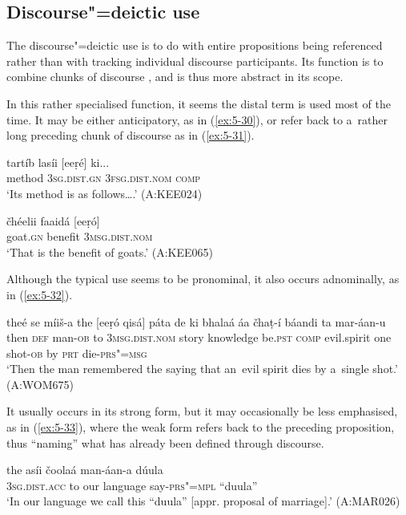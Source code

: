 \subsection{Discourse"=deictic use}
\label{subsec:5-2-5}

The discourse"=deictic use is to do with entire propositions being referenced rather than with tracking individual discourse participants. Its function is to combine chunks of discourse \citep[432]{diessel2006}, and is thus more abstract in its scope.



In this rather specialised function, it seems the distal term is used most of the time. It may be either anticipatory, as in (\ref{ex:5-30}), or refer back to a~rather long preceding chunk of discourse as in (\ref{ex:5-31}).

\begin{exe}
\ex
\label{ex:5-30}
\gll tartíb lasíi [eeṛé] ki...\\
method \textsc{3sg}.\textsc{dist.gn} \textsc{3fsg}.\textsc{dist.nom} \textsc{comp}\\
\glt `Its method is as follows{\ldots}.' (A:KEE024)

\ex
\label{ex:5-31}
\gll čhéelii faaidá [eeṛó]\\
goat.\textsc{gn} benefit \textsc{3msg}.\textsc{dist.nom}\\
\glt `That is the benefit of goats.' (A:KEE065)
\end{exe}
Although the typical use seems to be pronominal, it also occurs adnominally, as in (\ref{ex:5-32}).
\begin{exe}
\ex
\label{ex:5-32}
\gll theé se míiš-a the [eeṛó qisá] páta de ki bhalaá áa čhaṭ-í báandi ta mar-áan-u\\
then \textsc{def} man-\textsc{ob} to \textsc{3msg}.\textsc{dist.nom} story knowledge be.\textsc{pst} \textsc{comp} evil.spirit one shot-\textsc{ob} by \textsc{prt} die-\textsc{prs"=msg}\\
\glt `Then the man remembered the saying that an~evil spirit dies by a~single shot.' (A:WOM675)
\end{exe}
It usually occurs in its strong form, but it may occasionally be less emphasised, as in (\ref{ex:5-33}), where the weak form refers back to the preceding proposition, thus ``naming'' what has already been defined through discourse.
\begin{exe}
\ex
\label{ex:5-33}
\gll [ṛas] the asíi čoolaá man-áan-a dúula\\
\textsc{3sg}.\textsc{dist.acc} to our language say-\textsc{prs"=mpl} ``duula''\\
\glt `In our language we call this ``duula'' [appr. proposal of marriage].' (A:MAR026)
\end{exe}

